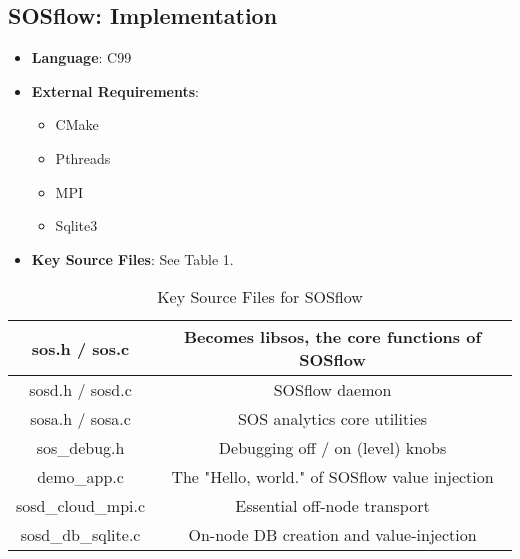 \subsection{SOSflow: Implementation}
\begin{itemize}
  \item \textbf{Language}: C99
   \item \textbf{External Requirements}:
   \begin{itemize}
    \item CMake
    \item Pthreads
    \item MPI
    \item Sqlite3
    \end{itemize}
  \item \textbf{Key Source Files}: See Table 1.
\end{itemize}

\begin{table}[!t]
\renewcommand{\arraystretch}{1.3}
\caption{Key Source Files for SOSflow}
\label{tableexample}
\centering
\begin{tabular}{|c|c|}
\hline %
sos.h / sos.c & Becomes libsos, the core functions of SOSflow\\
\hline %
sosd.h / sosd.c & SOSflow daemon\\
\hline %
sosa.h / sosa.c & SOS analytics core utilities\\
\hline %
sos\_debug.h & Debugging off / on (level) knobs\\
\hline %
demo\_app.c & The "Hello, world." of SOSflow value injection\\
\hline %
sosd\_cloud\_mpi.c & Essential off-node transport\\
\hline %
sosd\_db\_sqlite.c & On-node DB creation and value-injection\\
\hline %
\end{tabular}
\end{table}


